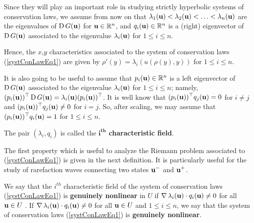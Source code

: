 Since they will play an important role in studying strictly hyperbolic
systems of conservation laws, we assume from now on that
$\lambda_1(\mathbf{u}) < \lambda_2(\mathbf{u}) < \ldots < \lambda_n(\mathbf{u})$
are the eigenvalues of $\operatorname{D} G(\mathbf{u})$ for $\mathbf{u} \in \mathbb{R}^n$,
and $q_i(\mathbf{u}) \in \mathbb{R}^n$ is a (right) eigenvector of $\operatorname{D} G(\mathbf{u})$
associated to the eigenvalue $\lambda_i(\mathbf{u})$ for $1 \leq i \leq n$.

Hence, the $x$,$y$ characteristics associated to the system of
conservation laws (\ref{systConLawEq1}) are given by
$\rho'(y) = \lambda_i(u(\rho(y),y))$ for $1\leq i \leq n$.

It is also going to be useful to assume that $p_i(\mathbf{u}) \in \mathbb{R}^n$
is a left eigenvector of $\operatorname{D} G(\mathbf{u})$ associated to the
eigenvalue $\lambda_i(\mathbf{u})$ for $1 \leq i \leq n$; 
namely, $\displaystyle (p_i(\mathbf{u}))^\top \operatorname{D} G(\mathbf{u})
= \lambda_i(\mathbf{u}) (p_i(\mathbf{u}))^\top$.  It is well know that
$\displaystyle (p_i(\mathbf{u}))^\top q_j(\mathbf{u}) = 0$ for $i \neq j$
and $\displaystyle (p_i(\mathbf{u}))^\top q_j(\mathbf{u}) \neq 0$ for $i=j$.
So, after scaling, we may assume that
$\displaystyle (p_i(\mathbf{u}))^\top q_i(\mathbf{u}) =1$
for $1\leq i \leq n$.

\begin{defn}
The pair $(\lambda_i,q_i)$ is called the
{\bfseries $\displaystyle \mathbf{i^{th}}$ characteristic
field}.
\end{defn}

The first property which is useful to analyze the Riemann problem associated to
(\ref{systConLawEq1}) is given in the next definition.  It is
particularly useful for the study of rarefaction waves connecting two
states $\displaystyle \mathbf{u}^-$ and $\displaystyle \mathbf{u}^+$.

\begin{defn}
We say that the $\displaystyle i^{th}$ characteristic field of the system
of conservation laws (\ref{systConLawEq1}) is
{\bfseries genuinely nonlinear}
in $U$ if
$\operatorname{\nabla} \lambda_i(\mathbf{u}) \cdot q_i(\mathbf{u}) \neq 0$
for all $\mathbf{u} \in U$ \footnotemark.
If $\operatorname{\nabla} \lambda_i(\mathbf{u}) \cdot q_i(\mathbf{u}) \neq 0$
for all $\mathbf{u} \in U$ and $1\leq i \leq n$, we say
that the system of conservation laws (\ref{systConLawEq1}) is
{\bfseries genuinely nonlinear}.
\end{defn}

